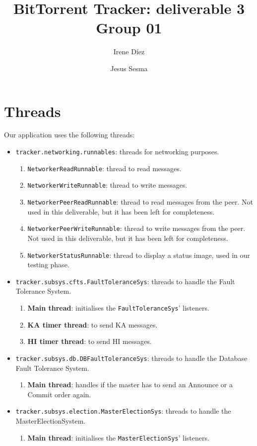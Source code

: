 \documentclass[twoside,a4paper,10pt]{article}
\title{BitTorrent Tracker: deliverable 3\\
  Group 01}
\author{Irene Díez \and Jesus Sesma}
\begin{document}
\date{}
\maketitle

\section{Threads}\label{sec:pa-hierarchy}

Our application uses the following threads:
\begin{itemize}
\item \texttt{tracker.networking.runnables}: threads for networking purposes.
  \begin{enumerate}
  \item \texttt{NetworkerReadRunnable}: thread to read messages.
  \item \texttt{NetworkerWriteRunnable}: thread to write messages.
  \item \texttt{NetworkerPeerReadRunnable}: thread to read messages from the
    peer. Not used in this deliverable, but it has been left for completeness.
  \item \texttt{NetworkerPeerWriteRunnable}: thread to write messages from the
    peer. Not used in this deliverable, but it has been left for completeness.
  \item \texttt{NetworkerStatusRunnable}: thread to display a status image,
    used in our testing phase.
  \end{enumerate}
\item \texttt{tracker.subsys.cfts.FaultToleranceSys}: threads to handle
  the Fault Tolerance System.
  \begin{enumerate}
  \item \textbf{Main thread}: initialises the \texttt{FaultToleranceSys}'
    listeners.
  \item \textbf{KA timer thread}: to send KA messages.
  \item \textbf{HI timer thread}: to send HI messages.
  \end{enumerate}
\item \texttt{tracker.subsys.db.DBFaultToleranceSys}: threads to handle
  the Database Fault Tolerance System.
  \begin{enumerate}
  \item \textbf{Main thread}: handles if the master has to send an Announce
    or a Commit order again.
  \end{enumerate}
\item \texttt{tracker.subsys.election.MasterElectionSys}: threads to handle
  the MasterElectionSystem.
  \begin{enumerate}
  \item \textbf{Main thread}: initialises the  \texttt{MasterElectionSys}'
    listeners.
  \end{enumerate}
\end{itemize}

%
%
\end{document}

